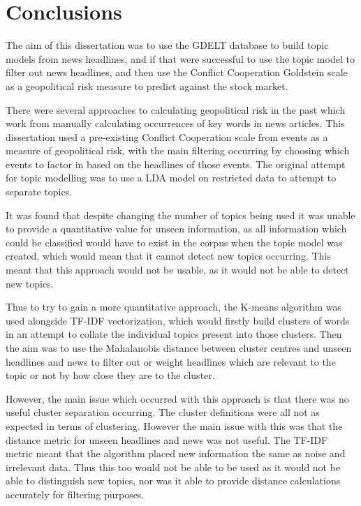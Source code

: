 \section{Conclusions}
The aim of this dissertation was to use the GDELT database to build topic models from news headlines, and if that were successful to use the topic model to filter out news headlines, and then use the Conflict Cooperation Goldstein scale as a geopolitical risk measure to predict against the stock market. 

There were several approaches to calculating geopolitical risk in the past which work from manually calculating occurrences of key words in news articles. This dissertation used a pre-existing Conflict Cooperation scale from events as a measure of geopolitical risk, with the main filtering occurring by choosing which events to factor in based on the headlines of those events.  The original attempt for topic modelling was to use a LDA model on restricted data to attempt to separate topics.    

It was found that despite changing the number of topics being used it was unable to provide a quantitative value for unseen information, as all information which could be classified would have to exist in the corpus when the topic model was created, which would mean that it cannot detect new topics occurring. This meant that this approach would not be usable, as it would not be able to detect new topics.

Thus to try to gain a more quantitative approach, the K-means algorithm was used alongside TF-IDF vectorization, which would  firstly build clusters of words in an attempt to collate the individual topics present into those clusters. Then the aim was to use the Mahalanobis distance between cluster centres and unseen headlines and news to filter out or weight headlines which are relevant to the topic or not by how close they are to the cluster. 

However, the main issue which occurred with this approach is that there was no useful cluster separation occurring. The cluster definitions were all not as expected in terms of clustering. However the main issue with this was that the distance metric for unseen headlines and news was not useful. The TF-IDF metric meant that the algorithm placed new information the same as noise and irrelevant data. Thus this too would not be able to be used as it would not be able to distinguish new topics, nor was it able to provide distance calculations accurately for filtering purposes.

